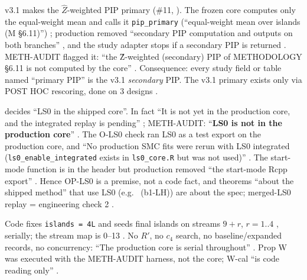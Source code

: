 \begin{divergence}
v3.1 makes the $\hat Z$-weighted PIP primary (\#11, ). The frozen core computes only the equal-weight mean and calls it
\texttt{pip\_primary} (``equal-weight mean over islands (M §6.11)'')
; production removed ``secondary PIP computation and
outputs on both branches'' , and the study adapter
stops if a secondary PIP is returned . METH-AUDIT
flagged it: ``the Ẑ-weighted (secondary) PIP of METHODOLOGY §6.11 is not computed by the core''
. Consequence: every study field or table named ``primary PIP'' is the v3.1
\emph{secondary} PIP. The v3.1 primary exists only via POST HOC rescoring, done on 3 designs
.
\end{divergence}

\begin{divergence}
 decides ``LS0 in the shipped core''. In fact ``It is not yet in the production core, and the integrated replay is
pending'' ; METH-AUDIT: ``\textbf{LS0 is not in the production core}''
. The O-LS0 check ran LS0 as a test export on the production core, and ``No
production SMC fits were rerun with LS0 integrated (\texttt{ls0\_enable\_integrated} exists in \texttt{ls0\_core.R} but was not
used)'' . The start-mode function is in the header but production removed ``the
start-mode Rcpp export'' . Hence OP-LS0 is a
premise, not a code fact, and theorems ``about the shipped method'' that use LS0 (e.g.\  (b1-LH)) are about the
spec; merged-LS0 replay = engineering check 2 .
\end{divergence}

\begin{divergence}
Code fixes \texttt{islands = 4L}  and seeds final
islands on streams $9+r$, $r=1..4$ ,
serially; the stream map is 0--13 . No $R'$, no
$c_4$ search, no baseline/expanded records, no concurrency: ``The production core is serial throughout''
. Prop W was executed with the METH-AUDIT harness, not the core; W-cal ``is
code reading only'' .
\end{divergence}

